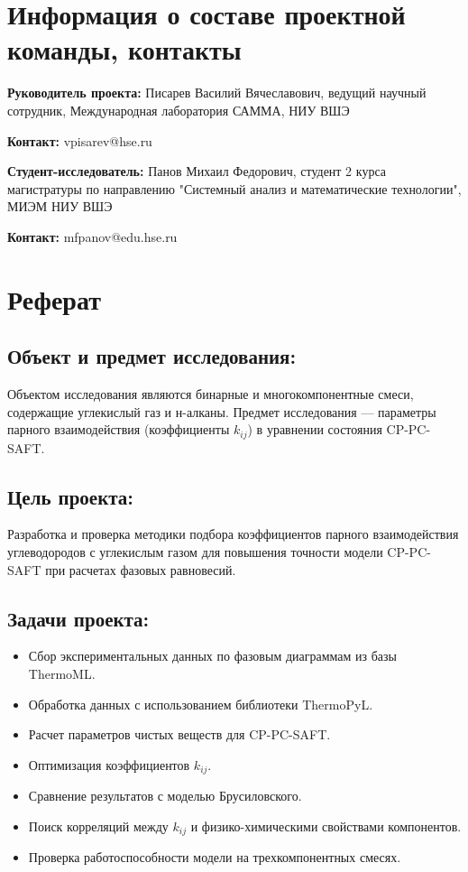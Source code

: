 \documentclass[a4paper,12pt]{article}
\begin{document}
\setcounter{page}{2}

\section*{Информация о составе проектной команды, контакты}
\textbf{Руководитель проекта:} Писарев Василий Вячеславович, ведущий научный сотрудник, Международная лаборатория САММА, НИУ ВШЭ

\textbf{Контакт:} vpisarev@hse.ru

\smallskip

\textbf{Студент-исследователь:} Панов Михаил Федорович, студент 2 курса магистратуры по направлению "Системный анализ и математические технологии", МИЭМ НИУ ВШЭ

\textbf{Контакт:} mfpanov@edu.hse.ru

\section*{Реферат}
\subsection*{Объект и предмет исследования:}
Объектом исследования являются бинарные и многокомпонентные смеси, содержащие углекислый газ и н-алканы. Предмет исследования — параметры парного взаимодействия (коэффициенты $k_{ij}$) в уравнении состояния CP-PC-SAFT.

\subsection*{Цель проекта:}
Разработка и проверка методики подбора коэффициентов парного взаимодействия углеводородов с углекислым газом для повышения точности модели CP-PC-SAFT при расчетах фазовых равновесий.

\subsection*{Задачи проекта:}
\begin{itemize}
\item Сбор экспериментальных данных по фазовым диаграммам из базы ThermoML.
\item Обработка данных с использованием библиотеки ThermoPyL.
\item Расчет параметров чистых веществ для CP-PC-SAFT.
\item Оптимизация коэффициентов $k_{ij}$.
\item Сравнение результатов с моделью Брусиловского.
\item Поиск корреляций между $k_{ij}$ и физико-химическими свойствами компонентов.
\item Проверка работоспособности модели на трехкомпонентных смесях.
\end{itemize}
\end{document}
